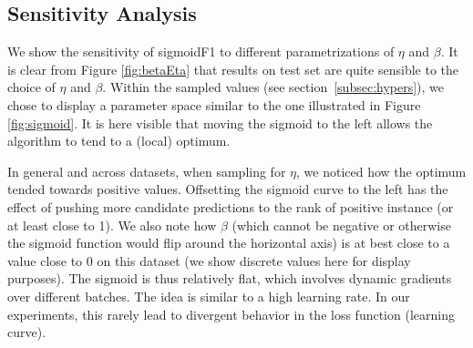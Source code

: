 \subsection{Sensitivity Analysis}

We show the sensitivity of sigmoidF1 to different parametrizations of $\eta$ and $\beta$. It is clear from Figure \ref{fig:betaEta} that results on test set are quite sensible to the choice of $\eta$ and $\beta$. Within the sampled values (see section~\ref{subsec:hypers}), we chose to display a parameter space similar to the one illustrated in Figure \ref{fig:sigmoid}. It is here visible that moving the sigmoid to the left allows the algorithm to tend to a (local) optimum.

In general and across datasets, when sampling for $\eta$, we noticed how the optimum tended towards positive values. Offsetting the sigmoid curve to the left has the effect of pushing more candidate predictions to the rank of positive instance (or at least close to 1). We also note how $\beta$ (which cannot be negative or otherwise the sigmoid function would flip around the horizontal axis) is at best close to a value close to 0 on this dataset (we show discrete values here for display purposes). The sigmoid is thus relatively flat, which involves dynamic gradients over different batches. The idea is similar to a high learning rate. In our experiments, this rarely lead to divergent behavior in the loss function (learning curve).







